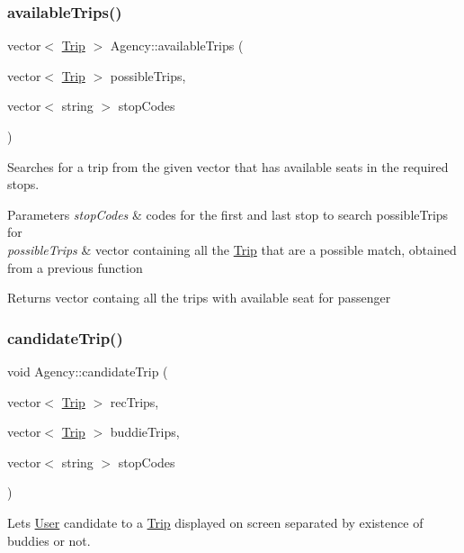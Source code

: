 \subsubsection{\texorpdfstring{available\+Trips()}{availableTrips()}}
{\footnotesize\ttfamily vector$<$ \hyperlink{class_trip}{Trip} $>$ Agency\+::available\+Trips (\begin{DoxyParamCaption}\item[{vector$<$ \hyperlink{class_trip}{Trip} $>$}]{possible\+Trips,  }\item[{vector$<$ string $>$}]{stop\+Codes }\end{DoxyParamCaption})}



Searches for a trip from the given vector that has available seats in the required stops. 


\begin{DoxyParams}{Parameters}
{\em stop\+Codes} & codes for the first and last stop to search possible\+Trips for \\
\hline
{\em possible\+Trips} & vector containing all the \hyperlink{class_trip}{Trip} that are a possible match, obtained from a previous function\\
\hline
\end{DoxyParams}
\begin{DoxyReturn}{Returns}
vector containg all the trips with available seat for passenger 
\end{DoxyReturn}
\mbox{\label{class_agency_a51d72590b842d0df300cd39846353f00}} 
\subsubsection{\texorpdfstring{candidate\+Trip()}{candidateTrip()}}
{\footnotesize\ttfamily void Agency\+::candidate\+Trip (\begin{DoxyParamCaption}\item[{vector$<$ \hyperlink{class_trip}{Trip} $>$}]{rec\+Trips,  }\item[{vector$<$ \hyperlink{class_trip}{Trip} $>$}]{buddie\+Trips,  }\item[{vector$<$ string $>$}]{stop\+Codes }\end{DoxyParamCaption})}



Lets \hyperlink{class_user}{User} candidate to a \hyperlink{class_trip}{Trip} displayed on screen separated by existence of buddies or not. 


